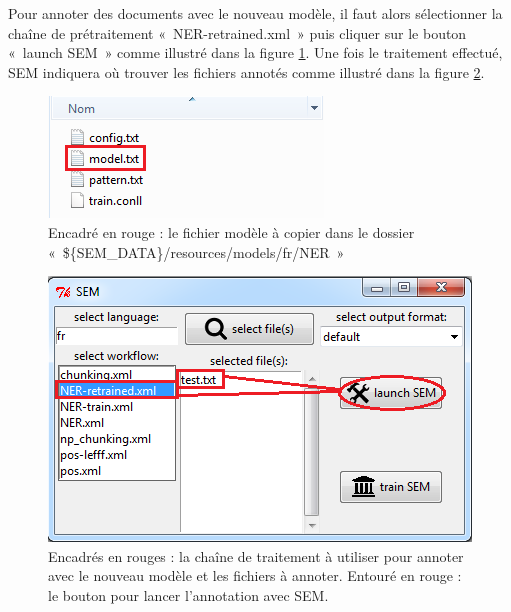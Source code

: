 \documentclass[manual-fr.tex]{subfiles}
\begin{document}
Pour annoter des documents avec le nouveau modèle, il faut alors sélectionner la chaîne de prétraitement «~NER-retrained.xml~» puis cliquer sur le bouton «~launch SEM~» comme illustré dans la figure \ref{fig:train_sem-07}. Une fois le traitement effectué, SEM indiquera où trouver les fichiers annotés comme illustré dans la figure \ref{fig:train_sem-08}.

\begin{figure}[ht!]
    \begin{center}
    \includegraphics[scale=0.5]{fr/images/train_sem-07.png}
    \end{center}
    \caption{Encadré en rouge : le fichier modèle à copier dans le dossier «~\$\{SEM\_DATA\}/resources/models/fr/NER~»}
    \label{fig:train_sem-07}
\end{figure}

\begin{figure}[ht!]
    \begin{center}
    \includegraphics[scale=0.5]{fr/images/train_sem-08.png}
    \end{center}
    \caption{Encadrés en rouges : la chaîne de traitement à utiliser pour annoter avec le nouveau modèle et les fichiers à annoter. Entouré en rouge : le bouton pour lancer l'annotation avec SEM.}
    \label{fig:train_sem-08}
\end{figure}
\end{document}
